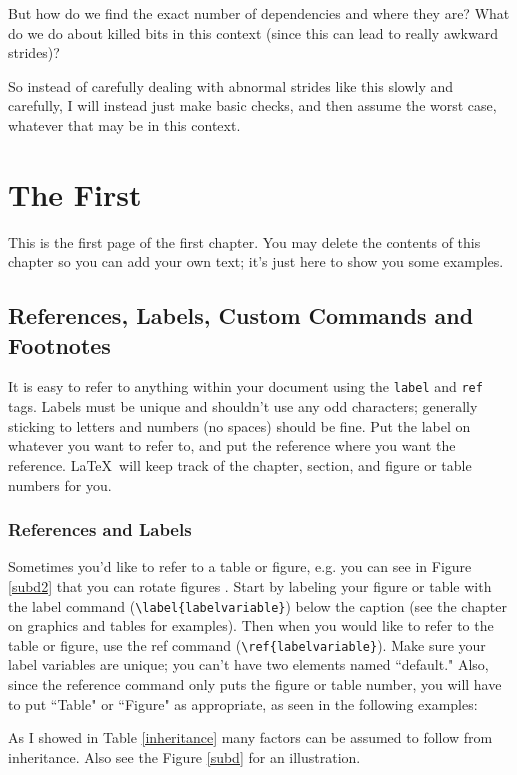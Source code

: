 \documentclass[12pt,twoside]{reedthesis}
\begin{document}
		But how do we find the exact number of dependencies and where they are? What do we do about killed bits in this context (since this can lead to really awkward strides)? 
		
		So instead of carefully dealing with abnormal strides like this slowly and carefully, I will instead just make basic checks, and then assume the worst case, whatever that may be in this context. 

\chapter{The First}
  	This is the first page of the first chapter. You may delete the contents of this chapter so you can add your own text; it's just here to show you some examples. 
	
	\section{References, Labels, Custom Commands and Footnotes}
	It is easy to refer to anything within your document using the \texttt{label} and \texttt{ref} tags.  Labels must be unique and shouldn't use any odd characters; generally sticking to letters and numbers (no spaces) should be fine. Put the label on whatever you want to refer to, and put the reference where you want the reference. \LaTeX\ will keep track of the chapter, section, and figure or table numbers for you. 
	
	\subsection{References and Labels}
	Sometimes you'd like to refer to a table or figure, e.g. you can see in Figure \ref{subd2} that you can rotate figures . Start by labeling your figure or table with the label command (\verb=\label{labelvariable}=) below the caption (see the chapter on graphics and tables for examples). Then when you would like to refer to the table or figure, use the ref command (\verb=\ref{labelvariable}=). Make sure your label variables are unique; you can't have two elements named ``default." Also, since the reference command only puts the figure or table number, you will have to put  ``Table" or ``Figure" as appropriate, as seen in the following examples:
	
	 As I showed in Table \ref{inheritance} many factors can be assumed to follow from inheritance. Also see the Figure \ref{subd} for an illustration.
		 
\end{document}
